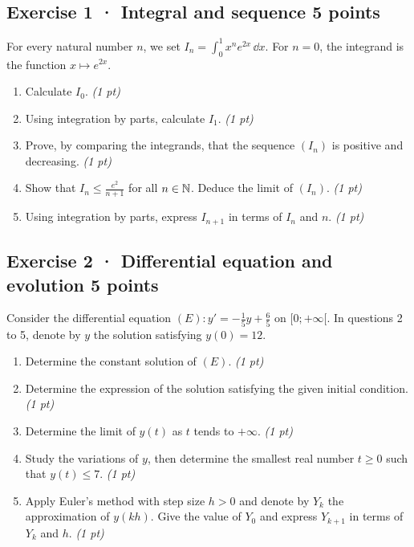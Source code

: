 \subsection*{Exercise 1 · Integral and sequence \hfill 5 points}For every natural number $n$, we set $I_n=\displaystyle\int_0^1x^ne^{2x}\,\dd x$. For $n=0$, the integrand is the function $x\mapsto e^{2x}$.

\begin{enumerate}

\item Calculate $I_0$. \hfill\textit{(1 pt)}

\item Using integration by parts, calculate $I_1$. \hfill\textit{(1 pt)}

\item Prove, by comparing the integrands, that the sequence $(I_n)$ is positive and decreasing. \hfill\textit{(1 pt)}

\item Show that $I_n\le\frac{e^{2}}{n+1}$ for all $n\in\mathbb N$. Deduce the limit of $(I_n)$. \hfill\textit{(1 pt)}

\item Using integration by parts, express $I_{n+1}$ in terms of $I_n$ and $n$. \hfill\textit{(1 pt)}

\end{enumerate}

\subsection*{Exercise 2 · Differential equation and evolution \hfill 5 points}Consider the differential equation $(E):y'=-\frac1{5}y+\frac{6}{5}$ on $[0;+\infty[$. In questions 2 to 5, denote by $y$ the solution satisfying $y(0)=12$.

\begin{enumerate}

\item Determine the constant solution of $(E)$. \hfill\textit{(1 pt)}

\item Determine the expression of the solution satisfying the given initial condition. \hfill\textit{(1 pt)}

\item Determine the limit of $y(t)$ as $t$ tends to $+\infty$. \hfill\textit{(1 pt)}

\item Study the variations of $y$, then determine the smallest real number $t\ge0$ such that $y(t)\le7$. \hfill\textit{(1 pt)}

\item Apply Euler's method with step size $h>0$ and denote by $Y_k$ the approximation of $y(kh)$. Give the value of $Y_0$ and express $Y_{k+1}$ in terms of $Y_k$ and $h$. \hfill\textit{(1 pt)}

\end{enumerate}

